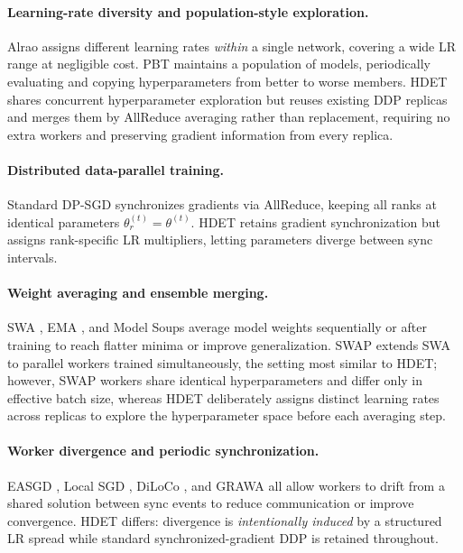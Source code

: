 \documentclass{article}
\begin{document}
\paragraph{Learning-rate diversity and population-style exploration.}
Alrao \citep{blier2019learning} assigns different learning rates \emph{within} a
single network, covering a wide LR range at negligible cost.
PBT \citep{jaderberg2017population} maintains a population of models, periodically
evaluating and copying hyperparameters from better to worse members.
HDET shares concurrent hyperparameter exploration but reuses existing DDP replicas
and merges them by AllReduce averaging rather than replacement, requiring no extra
workers and preserving gradient information from every replica.

\paragraph{Distributed data-parallel training.}
Standard DP-SGD \citep{li2020pytorch} synchronizes gradients via AllReduce, keeping
all ranks at identical parameters $\theta_r^{(t)} = \theta^{(t)}$.
HDET retains gradient synchronization but assigns rank-specific LR multipliers,
letting parameters diverge between sync intervals.

\paragraph{Weight averaging and ensemble merging.}
SWA \citep{izmailov2018averaging}, EMA \citep{ho2020denoising}, and Model Soups
\citep{wortsman2022model} average model weights sequentially or after training to reach
flatter minima or improve generalization.
SWAP \citep{gupta2020stochastic} extends SWA to parallel workers trained simultaneously,
the setting most similar to HDET; however, SWAP workers share identical hyperparameters
and differ only in effective batch size, whereas HDET deliberately assigns distinct
learning rates across replicas to explore the hyperparameter space before each
averaging step.

\paragraph{Worker divergence and periodic synchronization.}
EASGD \citep{zhang2015easgd}, Local SGD \citep{haddadpour2019local}, DiLoCo
\citep{douillard2023diloco}, and GRAWA \citep{dimlioglu2024grawa} all allow workers
to drift from a shared solution between sync events to reduce communication or improve
convergence.
HDET differs: divergence is \emph{intentionally induced} by a structured LR spread
while standard synchronized-gradient DDP is retained throughout.
\end{document}
